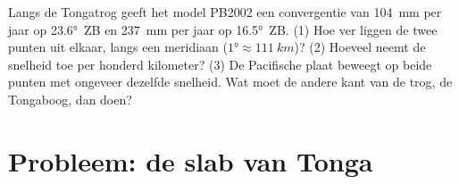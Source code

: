 \begin{exercise}[$\star\star\star$]\label{exo:g11:subduction-zones:15}
Langs de Tongatrog geeft het model PB2002 een convergentie van
\qty{104}{mm} per jaar op \ang{23.6}~ZB en \qty{237}{mm} per jaar op
\ang{16.5}~ZB. (1) Hoe ver liggen de twee punten uit elkaar, langs een meridiaan
($\ang{1} \approx \qty{111}{km}$)? (2) Hoeveel neemt de snelheid toe per
honderd kilometer? (3) De Pacifische plaat beweegt op beide punten met ongeveer
dezelfde snelheid. Wat moet de andere kant van de trog, de Tongaboog, dan doen?
\end{exercise}

\section{Probleem: de slab van Tonga}

